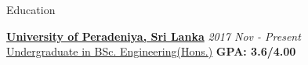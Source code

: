 \documentclass{resume} %
\begin{document}
\begin{rSection}{Education}

{\bf \href{http://eng.pdn.ac.lk}{University of Peradeniya, Sri Lanka}} \hfill {\em 2017 Nov - Present} 
\\ \href{http://www.ce.pdn.ac.lk/undergraduate-courses}{Undergraduate in BSc. Engineering(Hons.)} \hfill {\bf  GPA: 3.6/4.00}


\end{rSection}





\end{document}

